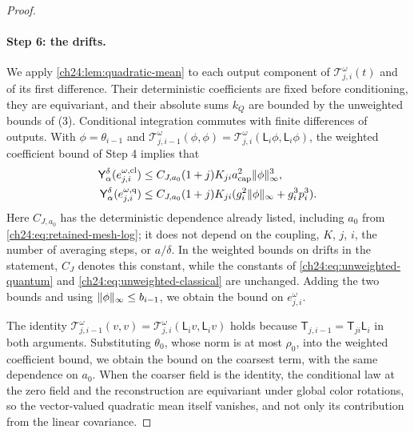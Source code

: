 \begin{proof}
\paragraph{Step 6: the drifts.}
We apply \cref{ch24:lem:quadratic-mean} to each output component of $\mathscr T_{j,i}^\omega(t)$ and of its first difference. Their deterministic coefficients are fixed before conditioning, they are equivariant, and their absolute sums $k_Q$ are bounded by the unweighted bounds of (3). Conditional integration commutes with finite differences of outputs. With $\phi=\theta_{i-1}$ and $\mathscr T_{j,i-1}^\omega(\phi,\phi)=\mathscr T_{j,i}^\omega(\mathsf L_i\phi,\mathsf L_i\phi)$, the weighted coefficient bound of Step 4 implies that
\begin{equation}\label{ch24:eq:weighted-mean-mesh}
 \begin{split}
 \mathsf Y_{\alpha}^{\delta}(e_{j,i}^{\omega,\mathrm{cl}})&\le C_{J,a_0}(1+j)K_{ji}a_{\mathrm{cap}}^2\lVert \phi\rVert_\infty^3,\\
 \mathsf Y_{\alpha}^{\delta}(e_{j,i}^{\omega,\mathrm q})&\le C_{J,a_0}(1+j)K_{ji}(g_i^2\lVert \phi\rVert_\infty+g_i^3p_i^3).
 \end{split}
\end{equation}
Here $C_{J,a_0}$ has the deterministic dependence already listed, including $a_0$ from \eqref{ch24:eq:retained-mesh-log}; it does not depend on the coupling, $K$, $j$, $i$, the number of averaging steps, or $a/\delta$. In the weighted bounds on drifts in the statement, $C_J$ denotes this constant, while the constants of \eqref{ch24:eq:unweighted-quantum} and \eqref{ch24:eq:unweighted-classical} are unchanged. Adding the two bounds and using $\lVert \phi\rVert_\infty\le b_{i-1}$, we obtain the bound on $e_{j,i}^\omega$.

The identity $\mathscr T_{j,i-1}^\omega(v,v)=\mathscr T_{j,i}^\omega(\mathsf L_iv,\mathsf L_iv)$ holds because $\mathsf T_{j,i-1}=\mathsf T_{ji}\mathsf L_i$ in both arguments. Substituting $\theta_0$, whose norm is at most $\rho_0$, into the weighted coefficient bound, we obtain the bound on the coarsest term, with the same dependence on $a_0$. When the coarser field is the identity, the conditional law at the zero field and the reconstruction are equivariant under global color rotations, so the vector-valued quadratic mean itself vanishes, and not only its contribution from the linear covariance.


\end{proof}
